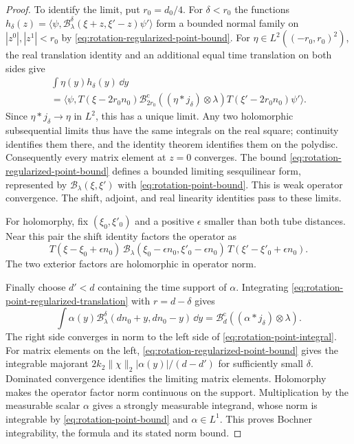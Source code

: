 \begin{proof}
To identify the limit, put $r_0=d_0/4$.
For $\delta<r_0$ the functions
$h_\delta(z)=\langle\psi,\mathcal B_\lambda^\delta
(\xi+z,\xi'-z)\psi'\rangle$ form a bounded normal family on
$|z^0|,|z^1|<r_0$ by
\eqref{eq:rotation-regularized-point-bound}.
For $\eta\in L^2((-r_0,r_0)^2)$, the real translation identity
and an additional equal time translation on both sides give
\begin{multline}\label{eq:rotation-point-limit-test}
 \int\eta(y)h_\delta(y)\,\dd y\\
 =\langle\psi,T(\xi-2r_0n_0)
       \mathcal B_{2r_0}^{\mathrm c}((\eta*j_\delta)\otimes\lambda)
       T(\xi'-2r_0n_0)\psi'\rangle.
\end{multline}
Since $\eta*j_\delta\to\eta$ in $L^2$, this has a unique limit.
Any two holomorphic subsequential limits thus have the same
integrals on the real square; continuity identifies them there,
and the identity theorem identifies them on the polydisc.
Consequently every matrix element at $z=0$ converges.
The bound \eqref{eq:rotation-regularized-point-bound} defines a
bounded limiting sesquilinear form, represented by
$\mathcal B_\lambda(\xi,\xi')$ with
\eqref{eq:rotation-point-bound}. This is weak operator convergence.
The shift, adjoint, and real linearity identities pass to these
limits.

For holomorphy, fix $(\xi_0,\xi'_0)$ and a positive $\epsilon$
smaller than both tube distances. Near this pair the shift identity
factors the operator as
\[
 T(\xi-\xi_0+\epsilon n_0)\,
 \mathcal B_\lambda(\xi_0-\epsilon n_0,\xi'_0-\epsilon n_0)\,
 T(\xi'-\xi'_0+\epsilon n_0).
\]
The two exterior factors are holomorphic in operator norm.

Finally choose $d'<d$ containing the time support of $\alpha$.
Integrating
\eqref{eq:rotation-point-regularized-translation} with $r=d-\delta$
gives
\[
 \int\alpha(y)\mathcal B_\lambda^\delta(dn_0+y,dn_0-y)\,\dd y
       =\mathcal B_d^{\mathrm c}((\alpha*j_\delta)\otimes\lambda).
\]
The right side converges in norm to the left side of
\eqref{eq:rotation-point-integral}. For matrix elements on the
left, \eqref{eq:rotation-regularized-point-bound} gives the
integrable majorant
$2k_2\|\chi\|_2|\alpha(y)|/(d-d')$ for sufficiently small $\delta$.
Dominated convergence identifies the limiting matrix elements.
Holomorphy makes the operator factor norm continuous on the
support. Multiplication by the measurable scalar $\alpha$ gives
a strongly measurable integrand, whose norm is integrable by
\eqref{eq:rotation-point-bound} and $\alpha\in L^1$. This proves
Bochner integrability, the formula and its stated norm bound.
\end{proof}

